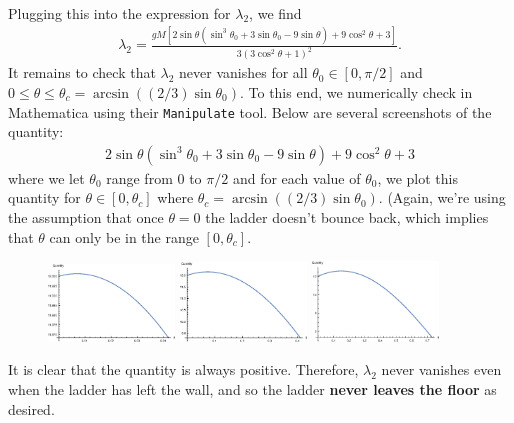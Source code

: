 \documentclass{article}
\theoremstyle{definition}
\begin{document}
\begin{enumerate}[label = (\alph*)]
\begin{align*}
		\end{align*}
		Plugging this into the expression for $\lambda_2$, we find 
		\begin{align*}
		\lambda_2 = \frac{gM \left[2 \sin\theta \left(\sin ^3\theta_0+3 \sin\theta_0-9 \sin\theta\right)+9 \cos ^2\theta+3\right]}{3\left(3 \cos ^2\theta+1\right)^2}.
		\end{align*}
		It remains to check that $\lambda_2$ never vanishes for all $\theta_0\in [0,\pi/2]$ and $0\leq \theta \leq \theta_c = \arcsin((2/3)\sin\theta_0)$. To this end, we numerically check in Mathematica using their \texttt{Manipulate} tool. Below are several screenshots of the quantity:
		\begin{align*}
		2 \sin\theta \left(\sin ^3\theta_0+3 \sin\theta_0-9 \sin\theta\right)+9 \cos ^2\theta+3
		\end{align*}
		where we let $\theta_0$ range from $0$ to $\pi/2$ and for each value of $\theta_0$, we plot this quantity for $\theta \in [0,\theta_c]$ where $\theta_c = \arcsin((2/3)\sin\theta_0)$. (Again, we're using the assumption that once $\theta=0$ the ladder doesn't bounce back, which implies that $\theta$ can only be in the range $[0,\theta_c]$.
		
		\begin{figure}[!htb]
			\centering
			\includegraphics[width=0.3\textwidth]{lambda2_1.eps}
			\includegraphics[width=0.3\textwidth]{lambda2_2.eps}
			\includegraphics[width=0.3\textwidth]{lambda2_3.eps}
		\end{figure}
		It is clear that the quantity is always positive. Therefore, $\lambda_2$ never vanishes even when the ladder has left the wall, and so the ladder \textbf{never leaves the floor} as desired. \\
		

\end{enumerate}
\end{document}
